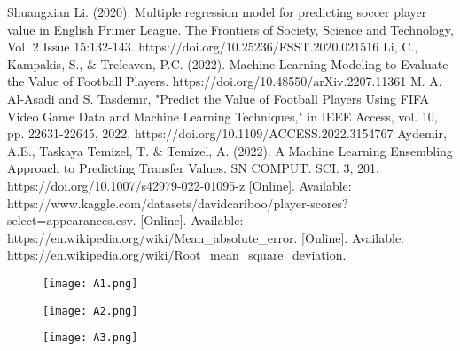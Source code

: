 \documentclass[conference]{IEEEtran}
\begin{document}
\begin{thebibliography}{00}
 Shuangxian Li. (2020). Multiple regression model for predicting soccer player value in English Primer League. The Frontiers of Society, Science and Technology, Vol. 2 Issue 15:132-143. https://doi.org/10.25236/FSST.2020.021516
 Li, C., Kampakis, S., & Treleaven, P.C. (2022). Machine Learning Modeling to Evaluate the Value of Football Players. https://doi.org/10.48550/arXiv.2207.11361
 M. A. Al-Asadi and S. Tasdemır, "Predict the Value of Football Players Using FIFA Video Game Data and Machine Learning Techniques," in IEEE Access, vol. 10, pp. 22631-22645, 2022, https://doi.org/10.1109/ACCESS.2022.3154767 
 Aydemir, A.E., Taskaya Temizel, T. & Temizel, A. (2022). A Machine Learning Ensembling Approach to Predicting Transfer Values. SN COMPUT. SCI. 3, 201. https://doi.org/10.1007/s42979-022-01095-z
 [Online]. Available: https://www.kaggle.com/datasets/davidcariboo/player-scores?select=appearances.csv. 
 [Online]. Available: https://en.wikipedia.org/wiki/Mean\_absolute\_error.
 [Online]. Available: https://en.wikipedia.org/wiki/Root\_mean\_square\_deviation.  







\end{thebibliography}
\vspace{12pt}
\appendix
\begin{figure}[ht]
\begin{center}
\centerline{\texttt{[image: A1.png]}}
\label{bayespic}
\end{center}
\end{figure}
\begin{figure}[ht]
\begin{center}
\centerline{\texttt{[image: A2.png]}}
\label{bayespic}
\end{center}
\end{figure}
\begin{figure}[ht]
\begin{center}
\centerline{\texttt{[image: A3.png]}}
\label{bayespic}
\end{center}
\end{figure}
\end{document}
